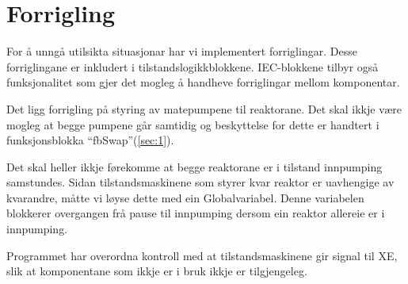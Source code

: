 \section{Forrigling}
\thispagestyle{fancy}

For å unngå utilsikta situasjonar har vi implementert forriglingar.
Desse forriglingane er inkludert i tilstandslogikkblokkene.\newline
\gls{IEC}-blokkene tilbyr også funksjonalitet som gjer det mogleg å handheve forriglingar mellom komponentar.

Det ligg forrigling på styring av matepumpene til reaktorane. Det skal ikkje være mogleg at begge pumpene går samtidig
og beskyttelse for dette er handtert i funksjonsblokka ``fbSwap''(\ref{sec:1}).

Det skal heller ikkje førekomme at begge reaktorane er i tilstand innpumping samstundes.
Sidan tilstandsmaskinene som styrer kvar reaktor er uavhengige av kvarandre, måtte vi løyse dette med ein
\gls{Globalvariabel}. Denne variabelen blokkerer overgangen frå pause til innpumping dersom ein reaktor allereie er i innpumping.

Programmet har overordna kontroll med at tilstandsmaskinene gir signal til XE, 
slik at komponentane som ikkje er i bruk ikkje er tilgjengeleg.

\newpage






